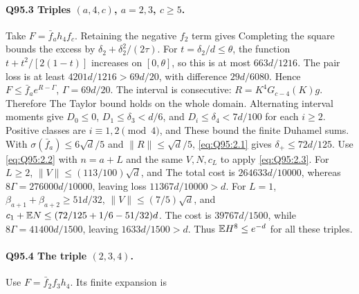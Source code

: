 \paragraph{Q95.3 Triples \((a,\allowbreak 4,\allowbreak c)\), \(a=\allowbreak 2,\allowbreak 3\), \(c\ge\allowbreak 5\).}
Take \(F=\allowbreak \bar f_ah_4f_c\). Retaining the negative \(f_2\) term gives
Completing the square bounds the excess by
\(\delta_2+\delta_2^2/(2\tau)\).
For \(t=\allowbreak \delta_2/d\le\allowbreak \theta\), the function
\(t+t^2/[2(1-t)]\) increases on \([0,\allowbreak \theta]\), so this is at most
\(663d/1216\). The pair loss is at least
\(4201d/1216>\allowbreak 69d/20\), with difference \(29d/6080\). Hence
\(F\le\allowbreak \bar f_ae^{R-\Gamma}\), \(\Gamma=\allowbreak 69d/20\).
The interval is consecutive:
\(R=\allowbreak K^4G_{c-4}(K)g\). Therefore
The Taylor bound holds on the whole domain. Alternating interval
moments give \(D_0\le\allowbreak 0\), \(D_1\le\allowbreak \delta_3<\allowbreak d/6\), and
\(D_i\le\allowbreak \delta_4<\allowbreak 7d/100\) for each \(i\ge\allowbreak 2\).
Positive classes are \(i\equiv1,\allowbreak 2\pmod4\), and
These bound the finite Duhamel sums. With
\(\sigma(\bar f_a)\le\allowbreak 6\sqrt d/5\) and \(\|R\|\le\allowbreak \sqrt d/5\),
\eqref{eq:Q95:2.1} gives \(\delta_+\le\allowbreak 72d/125\).
Use \eqref{eq:Q95:2.2} with \(n=\allowbreak a+L\) and the same \(V,\allowbreak N,\allowbreak c_L\)
to apply \eqref{eq:Q95:2.3}.
For \(L\ge\allowbreak 2\), \(\|V\|\le\allowbreak (113/100)\sqrt d\), and
The total cost is \(264633d/10000\), whereas
\(8\Gamma=\allowbreak 276000d/10000\), leaving loss \(11367d/10000>\allowbreak d\).
For \(L=\allowbreak 1\), \(\beta_{a+1}+\beta_{a+2}\ge\allowbreak 51d/32\),
\(\|V\|\le\allowbreak (7/5)\sqrt d\), and
\(c_1+\mathbb E N\le\allowbreak (72/125+1/6-51/32)d\).
The cost is \(39767d/1500\), while \(8\Gamma=\allowbreak 41400d/1500\), leaving
\(1633d/1500>\allowbreak d\). Thus \(\mathbb E H^8\le\allowbreak  e^{-d}\) for all these triples.

\paragraph{Q95.4 The triple \((2,\allowbreak 3,\allowbreak 4)\).}
Use \(F=\allowbreak \bar f_2f_3h_4\). Its finite expansion is

